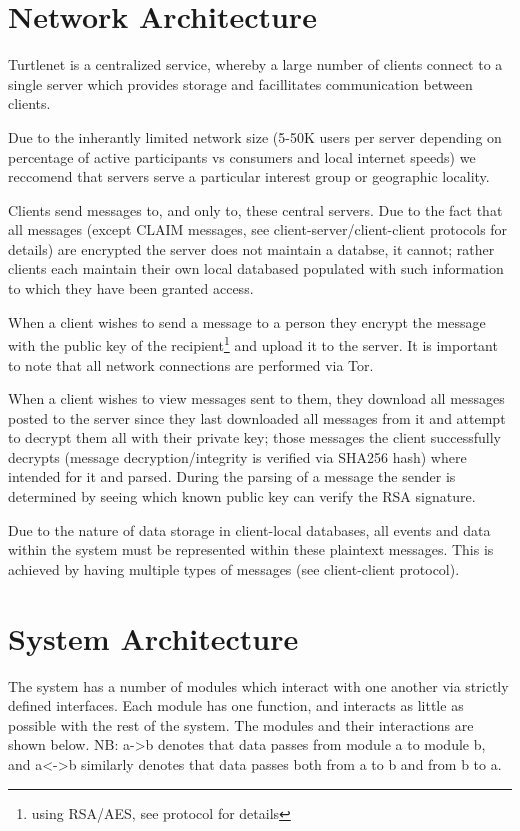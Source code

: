 \section{Network Architecture}
Turtlenet is a centralized service, whereby a large number of clients connect to
a single server which provides storage and facillitates communication between
clients.

Due to the inherantly limited network size (5-50K users per server depending on
percentage of active participants vs consumers and local internet speeds) we
reccomend that servers serve a particular interest group or geographic locality.

Clients send messages to, and only to, these central servers. Due to the fact
that all messages (except CLAIM messages, see client-server/client-client
protocols for details) are encrypted the server does not maintain a databse, it
cannot; rather clients each maintain their own local databased populated with
such information to which they have been granted access.

When a client wishes to send a message to a person they encrypt the message with
the public key of the recipient\footnote{using RSA/AES, see protocol for
details} and upload it to the server. It is important to note that all network
connections are performed via Tor.

When a client wishes to view messages sent to them, they download all messages
posted to the server since they last downloaded all messages from it and attempt
to decrypt them all with their private key; those messages the client
successfully decrypts (message decryption/integrity is verified via SHA256 hash)
where intended for it and parsed. During the parsing of a message the sender is
determined by seeing which known public key can verify the RSA signature.

Due to the nature of data storage in client-local databases, all events and data
within the system must be represented within these plaintext messages. This is
achieved by having multiple types of messages (see client-client protocol).

\section{System Architecture}
The system has a number of modules which interact with one another via strictly
defined interfaces. Each module has one function, and interacts as little as
possible with the rest of the system. The modules and their interactions are
shown below.
NB: a->b denotes that data passes from module a to module b, and a<->b similarly
denotes that data passes both from a to b and from b to a.


